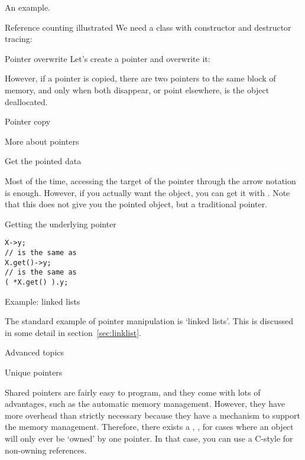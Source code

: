 An example.

\begin{block}{Reference counting illustrated}
  \label{sl:construct-destruct-trace}
  We need a class with constructor and destructor tracing:
\end{block}

\begin{block}{Pointer overwrite}
  \label{sl:shared-ptr-overwrite}
  Let's create a pointer and overwrite it:
\end{block}

However, if a pointer is copied, there are two pointers to the same
block of memory, and only when both disappear, or point elsewhere, is
the object deallocated.

\begin{block}{Pointer copy}
  \label{sl:shared-ptr-copy}
\end{block}

 {More about pointers}

 {Get the pointed data}

Most of the time, accessing the target of the pointer through the
arrow notation is enough. However, if you actually want the object,
you can get it with . Note that this does not give
you the pointed object, but a traditional pointer.

\begin{block}{Getting the underlying pointer}
  \label{sl:pointer-get}
\begin{lstlisting}
X->y;
// is the same as
X.get()->y;
// is the same as
( *X.get() ).y;
\end{lstlisting}

\end{block}

 {Example: linked lists}

The standard example of pointer manipulation is `linked lists'. This
is discussed in some detail in section~\ref{sec:linklist}.

 {Advanced topics}

 {Unique pointers}

Shared pointers are fairly easy to program, and they come with lots of
advantages, such as the automatic memory management. However, they
have more overhead than strictly necessary because they have a
 mechanism to support the memory
management. Therefore, there exists a ,
, for cases where an object will only ever be
`owned' by one pointer. In that case, you can use a C-style
 for non-owning references.

